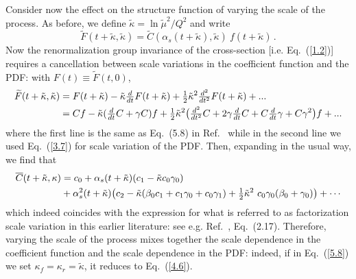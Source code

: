 Consider now the effect on the structure function of varying the scale of the process.
%
As before, we define $\tilde\kappa = \ln\tilde{\mu}^2/Q^2$ and write
%
\begin{equation}
    \widetilde{F}(t + \tilde\kappa, \tilde\kappa) = \widetilde{C}(\alpha_s(t + \tilde\kappa), \tilde\kappa)\ f(t+ \tilde\kappa) \, .
\label{4.2}
\end{equation}
%
Now the renormalization group invariance of the cross-section [i.e. Eq.~(\ref{1.2})] requires a cancellation between scale variations in the coefficient function and the PDF: with $F(t) \equiv \widetilde{F}(t, 0)$,
%
\begin{equation}
\begin{split}
     \widetilde{F}(t + \tilde\kappa, \tilde\kappa) &= F(t + \tilde\kappa) - \tilde\kappa \hbox{${{d}\over {dt}}$}{F}(t+\tilde\kappa) +\hbox{${{1}\over {2}}$} \tilde\kappa^2  \hbox{${{d^2}\over {dt^2}}$}{F}(t + \tilde\kappa) + ... \\
     &= Cf - \tilde\kappa(\hbox{${{d}\over {dt}}$} C + \gamma C)f + \hbox{${{1}\over {2}}$} \tilde\kappa^2  \big(\hbox{${{d^2}\over {dt^2}}$}{C} + 2\gamma\hbox{${{d}\over {dt}}$}{C} + C\hbox{${{d}\over {dt}}$}{\gamma} + C\gamma^2\big)f + ...
\end{split}
\label{4.3}
\end{equation}
%
where the first line is the same as Eq.~(5.8) in
Ref.~\cite{Altarelli:2008aj} while in the second line we used
Eq.~(\ref{3.7}) for scale variation of the PDF. Then, expanding in the
usual way, we find that 
%
\begin{equation}
\begin{split}
    \overline{C}(t + \tilde\kappa, \kappa) &= c_0 + \alpha_s(t+ \tilde\kappa)(c_1 -\tilde\kappa c_0 \gamma_0) \\
    &+ \alpha_s^2 ( t + \tilde\kappa)\big(c_2 - \tilde\kappa(\beta_0 c_1 + c_1 \gamma_0 + c_0 \gamma_1) + \hbox{${{1}\over {2}}$} \tilde\kappa^2 \ c_0 \gamma_0 (\beta_0 + \gamma_0)\big)+\cdots
\end{split}
\label{4.6}
\end{equation}
%
which indeed coincides with the expression for what is referred to
as factorization scale  
variation in this earlier literature: see
e.g. Ref.~\cite{vanNeerven:2000uj}, Eq.~(2.17).
%
Therefore, varying  
the scale of the process mixes together the scale dependence in the 
coefficient function and the scale dependence in the PDF: indeed, if
in Eq.~(\ref{5.8}) we set
$\kappa_f=\kappa_r=\tilde\kappa$, it reduces to
Eq.~(\ref{4.6}). 

